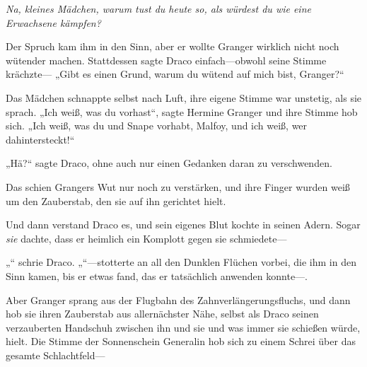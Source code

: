 \emph{Na, kleines Mädchen, warum tust du heute so, als würdest du wie eine Erwachsene kämpfen?}

Der Spruch kam ihm in den Sinn, aber er wollte Granger wirklich nicht noch wütender machen. Stattdessen sagte Draco einfach—obwohl seine Stimme krächzte— „Gibt es einen Grund, warum du wütend auf mich bist, Granger?“

Das Mädchen schnappte selbst nach Luft, ihre eigene Stimme war unstetig, als sie sprach. „Ich weiß, was du vorhast“, sagte Hermine Granger und ihre Stimme hob sich. „Ich weiß, was du und Snape vorhabt, Malfoy, und ich weiß, wer dahintersteckt!“

„Hä?“ sagte Draco, ohne auch nur einen Gedanken daran zu verschwenden.

Das schien Grangers Wut nur noch zu verstärken, und ihre Finger wurden weiß um den Zauberstab, den sie auf ihn gerichtet hielt.

Und dann verstand Draco es, und sein eigenes Blut kochte in seinen Adern. Sogar \emph{sie} dachte, dass er heimlich ein Komplott gegen sie schmiedete—

„“ schrie Draco. „“—stotterte an all den Dunklen Flüchen vorbei, die ihm in den Sinn kamen, bis er etwas fand, das er tatsächlich anwenden konnte—.

Aber Granger sprang aus der Flugbahn des Zahnverlängerungsfluchs, und dann hob sie ihren Zauberstab aus allernächster Nähe, selbst als Draco seinen verzauberten Handschuh zwischen ihn und sie und was immer sie schießen würde, hielt. Die Stimme der Sonnenschein Generalin hob sich zu einem Schrei über das gesamte Schlachtfeld—

